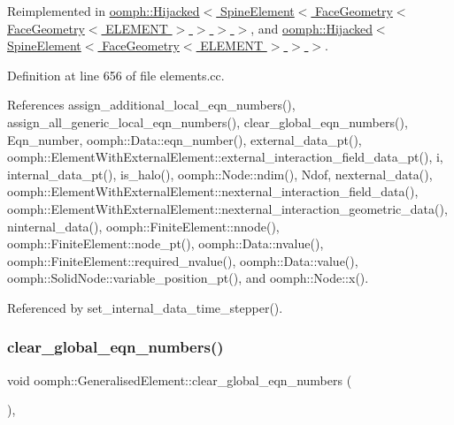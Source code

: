 Reimplemented in \hyperlink{classoomph_1_1Hijacked_afd4a5578291487aa37b0931dab845701}{oomph\+::\+Hijacked$<$ Spine\+Element$<$ Face\+Geometry$<$ Face\+Geometry$<$ E\+L\+E\+M\+E\+N\+T $>$ $>$ $>$ $>$}, and \hyperlink{classoomph_1_1Hijacked_afd4a5578291487aa37b0931dab845701}{oomph\+::\+Hijacked$<$ Spine\+Element$<$ Face\+Geometry$<$ E\+L\+E\+M\+E\+N\+T $>$ $>$ $>$}.



Definition at line 656 of file elements.\+cc.



References assign\+\_\+additional\+\_\+local\+\_\+eqn\+\_\+numbers(), assign\+\_\+all\+\_\+generic\+\_\+local\+\_\+eqn\+\_\+numbers(), clear\+\_\+global\+\_\+eqn\+\_\+numbers(), Eqn\+\_\+number, oomph\+::\+Data\+::eqn\+\_\+number(), external\+\_\+data\+\_\+pt(), oomph\+::\+Element\+With\+External\+Element\+::external\+\_\+interaction\+\_\+field\+\_\+data\+\_\+pt(), i, internal\+\_\+data\+\_\+pt(), is\+\_\+halo(), oomph\+::\+Node\+::ndim(), Ndof, nexternal\+\_\+data(), oomph\+::\+Element\+With\+External\+Element\+::nexternal\+\_\+interaction\+\_\+field\+\_\+data(), oomph\+::\+Element\+With\+External\+Element\+::nexternal\+\_\+interaction\+\_\+geometric\+\_\+data(), ninternal\+\_\+data(), oomph\+::\+Finite\+Element\+::nnode(), oomph\+::\+Finite\+Element\+::node\+\_\+pt(), oomph\+::\+Data\+::nvalue(), oomph\+::\+Finite\+Element\+::required\+\_\+nvalue(), oomph\+::\+Data\+::value(), oomph\+::\+Solid\+Node\+::variable\+\_\+position\+\_\+pt(), and oomph\+::\+Node\+::x().



Referenced by set\+\_\+internal\+\_\+data\+\_\+time\+\_\+stepper().

\mbox{\label{classoomph_1_1GeneralisedElement_a75da2bf85ec82c9d59cbb2e06f82b9a1}} 
\subsubsection{\texorpdfstring{clear\+\_\+global\+\_\+eqn\+\_\+numbers()}{clear\_global\_eqn\_numbers()}}
{\footnotesize\ttfamily void oomph\+::\+Generalised\+Element\+::clear\+\_\+global\+\_\+eqn\+\_\+numbers (\begin{DoxyParamCaption}{ }\end{DoxyParamCaption})\hspace{0.3cm}{\ttfamily [inline]}, {\ttfamily [protected]}}



